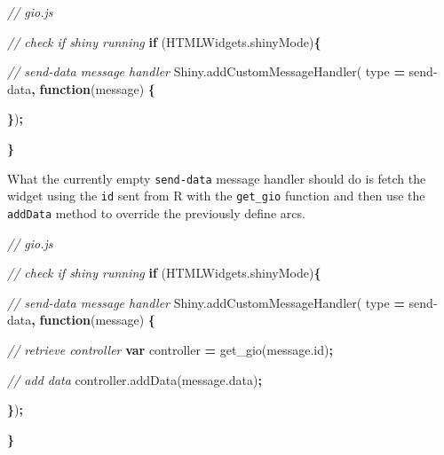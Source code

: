 \documentclass[
]{krantz}
\makeatletter
\newenvironment{Shaded}{\begin{snugshade}}{\end{snugshade}}
\newcommand{\AttributeTok}[1]{\textcolor[rgb]{0.61,0.61,0.61}{#1}}
\newcommand{\CommentTok}[1]{\textcolor[rgb]{0.37,0.37,0.37}{\textit{#1}}}
\newcommand{\ControlFlowTok}[1]{\textcolor[rgb]{0.27,0.27,0.27}{\textbf{#1}}}
\newcommand{\KeywordTok}[1]{\textcolor[rgb]{0.27,0.27,0.27}{\textbf{#1}}}
\newcommand{\NormalTok}[1]{#1}
\newcommand{\OperatorTok}[1]{\textcolor[rgb]{0.43,0.43,0.43}{\textbf{#1}}}
\newcommand{\StringTok}[1]{\textcolor[rgb]{0.5,0.5,0.5}{#1}}
\newcommand{\VariableTok}[1]{\textcolor[rgb]{0,0,0}{#1}}
\newenvironment{kframe}{%
\medskip{}
\setlength{\fboxsep}{.8em}
 \def\at@end@of@kframe{}%
 \ifinner\ifhmode%
  \def\at@end@of@kframe{\end{minipage}}%
  \begin{minipage}{\columnwidth}%
 \fi\fi%
 \def\FrameCommand##1{\hskip\@totalleftmargin \hskip-\fboxsep
 \colorbox{shadecolor}{##1}\hskip-\fboxsep
     \hskip-\linewidth \hskip-\@totalleftmargin \hskip\columnwidth}%
 \MakeFramed {\advance\hsize-\width
   \@totalleftmargin\z@ \linewidth\hsize
   \@setminipage}}%
 {\par\unskip\endMakeFramed%
 \at@end@of@kframe}
\renewenvironment{Shaded}{\begin{kframe}}{\end{kframe}}
\makeatother
\begin{document}
\begin{Shaded}
\begin{Highlighting}[]
\CommentTok{// gio.js}

\CommentTok{// check if shiny running}
\ControlFlowTok{if}\NormalTok{ (}\VariableTok{HTMLWidgets}\NormalTok{.}\AttributeTok{shinyMode}\NormalTok{)}\OperatorTok{\{}

  \CommentTok{// send{-}data message handler}
  \VariableTok{Shiny}\NormalTok{.}\AttributeTok{addCustomMessageHandler}\NormalTok{(}
\NormalTok{    type }\OperatorTok{=} \StringTok{\textquotesingle{}send{-}data\textquotesingle{}}\OperatorTok{,} \KeywordTok{function}\NormalTok{(message) }\OperatorTok{\{}

  \OperatorTok{\}}\NormalTok{)}\OperatorTok{;}

\OperatorTok{\}}
\end{Highlighting}
\end{Shaded}

What the currently empty \texttt{send-data} message handler should do is fetch the widget using the \texttt{id} sent from R with the \texttt{get\_gio} function and then use the \texttt{addData} method to override the previously define arcs.

\begin{Shaded}
\begin{Highlighting}[]
\CommentTok{// gio.js}

\CommentTok{// check if shiny running}
\ControlFlowTok{if}\NormalTok{ (}\VariableTok{HTMLWidgets}\NormalTok{.}\AttributeTok{shinyMode}\NormalTok{)}\OperatorTok{\{}

  \CommentTok{// send{-}data message handler}
  \VariableTok{Shiny}\NormalTok{.}\AttributeTok{addCustomMessageHandler}\NormalTok{(}
\NormalTok{    type }\OperatorTok{=} \StringTok{\textquotesingle{}send{-}data\textquotesingle{}}\OperatorTok{,} \KeywordTok{function}\NormalTok{(message) }\OperatorTok{\{}

    \CommentTok{// retrieve controller}
    \KeywordTok{var}\NormalTok{ controller }\OperatorTok{=} \AttributeTok{get\_gio}\NormalTok{(}\VariableTok{message}\NormalTok{.}\AttributeTok{id}\NormalTok{)}\OperatorTok{;}

    \CommentTok{// add data}
    \VariableTok{controller}\NormalTok{.}\AttributeTok{addData}\NormalTok{(}\VariableTok{message}\NormalTok{.}\AttributeTok{data}\NormalTok{)}\OperatorTok{;}

  \OperatorTok{\}}\NormalTok{)}\OperatorTok{;}

\OperatorTok{\}}
\end{Highlighting}
\end{Shaded}
\end{document}
